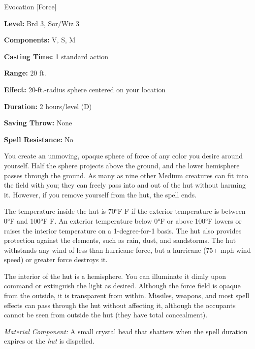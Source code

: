 
Evocation [Force]

\textbf{Level:} Brd 3, Sor/Wiz 3

\textbf{Components:} V, S, M

\textbf{Casting Time:} 1 standard action

\textbf{Range:} 20 ft.

\textbf{Effect:} 20-ft.-radius sphere centered on your location

\textbf{Duration:} 2 hours/level (D)

\textbf{Saving Throw:} None

\textbf{Spell Resistance:} No

You create an unmoving, opaque sphere of force of any color you desire around yourself. 
Half the sphere projects above the ground, and the lower hemisphere passes through 
the ground. As many as nine other Medium creatures can fit into the field with 
you; they can freely pass into and out of the hut without harming it. However, 
if you remove yourself from the hut, the spell ends.

The temperature inside the hut is 70°F F if the exterior temperature is between 
0°F and 100°F F. An exterior temperature below 0°F or above 100°F lowers or raises 
the interior temperature on a 1-degree-for-1 basis. The hut also provides protection 
against the elements, such as rain, dust, and sandstorms. The hut withstands any 
wind of less than hurricane force, but a hurricane (75+ mph wind speed) or greater 
force destroys it.

The interior of the hut is a hemisphere. You can illuminate it dimly upon command 
or extinguish the light as desired. Although the force field is opaque from the 
outside, it is transparent from within. Missiles, weapons, and most spell effects 
can pass through the hut without affecting it, although the occupants cannot be 
seen from outside the hut (they have total concealment).

\textit{Material Component:} A small crystal bead that shatters when the spell 
duration expires or the \textit{hut} is dispelled.

